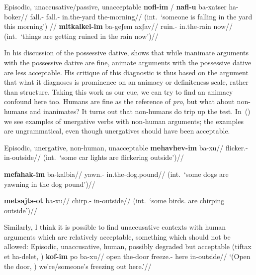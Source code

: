 \pex Episodic, unaccusative/passive, unacceptable
	\a	\ljudge{*} \begingl
		\gla \textbf{nofl-im} / \textbf{nafl-u} ba-xatser ha-boker//
		\glb fall.- {} fall.- in.the-yard the-morning//
		\glft (int.~`someone is falling in the yard this morning') //
	\endgl
	\a  \ljudge{*} \begingl
		\gla \textbf{mitkalkel-im} ba-geʃem axʃav//
		\glb ruin.- in.the-rain now//
		\glft (int.~`things are getting ruined in the rain now')//
	\endgl
\xe
		
In his discussion of the possessive dative, \cite{gafter14li} shows that while inanimate arguments with the possessive dative are fine, animate arguments with the possessive dative are less acceptable. His critique of this diagnostic is thus based on the argument that what it diagnoses is prominence on an animacy or definiteness scale, rather than structure. Taking this work as our cue, we can try to find an animacy confound here too. Humans are fine as the reference of \emph{pro}, but what about non-humans and inanimates? It turns out that non-humans do trip up the test. In~(\nextx) we see examples of unergative verbs with non-human arguments; the examples are ungrammatical, even though unergatives should have been acceptable.

\pex Episodic, unergative, non-human, unacceptable
		\a \ljudge{*} \begingl
			\gla \textbf{mehavhev-im} ba-xu{\ts}//
			\glb flicker.- in-outside//
			\glft (int.~`some car lights are flickering outside')//
		\endgl

		
		\a \ljudge{*} \begingl
			\gla \textbf{mefahak-im} ba-kalbia//
			\glb yawn.- in.the-dog.pound//
			\glft (int.~`some dogs are yawning in the dog pound')//
		\endgl

		\a \ljudge{*} \begingl
			\gla \textbf{metsajts-ot} ba-xu{\ts}//
			\glb chirp.- in-outside//
			\glft (int.~`some birds. are chirping outside')//
		\endgl		
\xe

Similarly, I think it is possible to find unaccusative contexts with human arguments which are relatively acceptable, something which should not be allowed:
\pex Episodic, unaccusative, human, possibly degraded but acceptable
	\a \begingl
		\gla (tiftax et ha-delet, ) \textbf{kof-im} po ba-xu{\ts}//
		\glb open  the-door {} freeze.- here in-outside//
		\glft `(Open the door, ) we're/someone's freezing out here.'//
	\endgl
	
